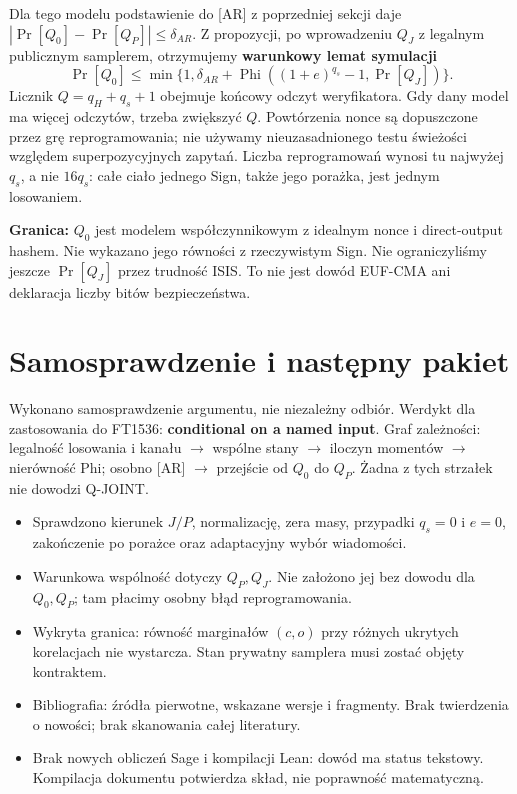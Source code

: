 \documentclass[11pt,a4paper]{article}
\newcommand{\PhiB}{\operatorname{Phi}}
\begin{document}
Dla tego modelu podstawienie do [AR] z poprzedniej sekcji daje
$|\Pr[Q_0]-\Pr[Q_P]|\le\delta_{AR}$.
Z propozycji, po wprowadzeniu $Q_J$ z legalnym publicznym samplerem,
otrzymujemy \textbf{warunkowy lemat symulacji}
\[
 \boxed{\Pr[Q_0]\le
 \min\{1,\delta_{AR}+\PhiB((1+e)^{q_s}-1,\Pr[Q_J])\}.}
\]
Licznik $Q=q_H+q_s+1$ obejmuje końcowy odczyt weryfikatora.
Gdy dany model ma więcej odczytów, trzeba zwiększyć $Q$.
Powtórzenia nonce są dopuszczone przez grę reprogramowania; nie używamy
nieuzasadnionego testu świeżości względem superpozycyjnych zapytań.
Liczba reprogramowań wynosi tu najwyżej $q_s$, a nie $16q_s$:
całe ciało jednego Sign, także jego porażka, jest jednym losowaniem.

\textbf{Granica:} $Q_0$ jest modelem współczynnikowym z idealnym nonce
i direct-output hashem. Nie wykazano jego równości z rzeczywistym Sign.
Nie ograniczyliśmy jeszcze $\Pr[Q_J]$ przez trudność ISIS.
To nie jest dowód EUF-CMA ani deklaracja liczby bitów bezpieczeństwa.

\section{Samosprawdzenie i następny pakiet}
Wykonano samosprawdzenie argumentu, nie niezależny odbiór.
Werdykt dla zastosowania do FT1536: \textbf{conditional on a named input}.
Graf zależności: legalność losowania i kanału $\to$ wspólne stany
$\to$ iloczyn momentów $\to$ nierówność Phi; osobno [AR] $\to$
przejście od $Q_0$ do $Q_P$. Żadna z tych strzałek nie dowodzi Q-JOINT.

\begin{itemize}
\item Sprawdzono kierunek $J/P$, normalizację, zera masy, przypadki
$q_s=0$ i $e=0$, zakończenie po porażce oraz adaptacyjny wybór wiadomości.
\item Warunkowa wspólność dotyczy $Q_P,Q_J$. Nie założono jej bez dowodu
dla $Q_0,Q_P$; tam płacimy osobny błąd reprogramowania.
\item Wykryta granica: równość marginałów $(c,o)$ przy różnych ukrytych
korelacjach nie wystarcza. Stan prywatny samplera musi zostać objęty kontraktem.
\item Bibliografia: źródła pierwotne, wskazane wersje i fragmenty.
Brak twierdzenia o nowości; brak skanowania całej literatury.
\item Brak nowych obliczeń Sage i kompilacji Lean: dowód ma status tekstowy.
Kompilacja dokumentu potwierdza skład, nie poprawność matematyczną.
\end{itemize}
\end{document}
